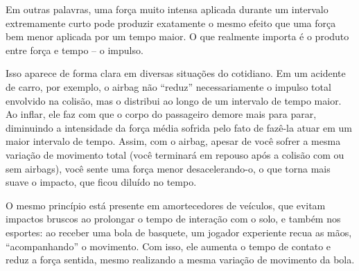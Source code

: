 Em outras palavras, uma força muito intensa aplicada durante um intervalo extremamente curto pode produzir exatamente o mesmo efeito que uma força bem menor aplicada por um tempo maior. O que realmente importa é o produto entre força e tempo -- o impulso.

Isso aparece de forma clara em diversas situações do cotidiano. Em um acidente de carro, por exemplo, o airbag não “reduz” necessariamente o impulso total envolvido na colisão, mas o distribui ao longo de um intervalo de tempo maior. Ao inflar, ele faz com que o corpo do passageiro demore mais para parar, diminuindo a intensidade da força média sofrida pelo fato de fazê-la atuar em um maior intervalo de tempo. Assim, com o airbag, apesar de você sofrer a mesma variação de movimento total (você terminará em repouso após a colisão com ou sem airbags), você sente uma força menor desacelerando-o, o que torna mais suave o impacto, que ficou diluído no tempo.

O mesmo princípio está presente em amortecedores de veículos, que evitam impactos bruscos ao prolongar o tempo de interação com o solo, e também nos esportes: ao receber uma bola de basquete, um jogador experiente recua as mãos, “acompanhando” o movimento. Com isso, ele aumenta o tempo de contato e reduz a força sentida, mesmo realizando a mesma variação de movimento da bola.


\vspace{0.3cm}


